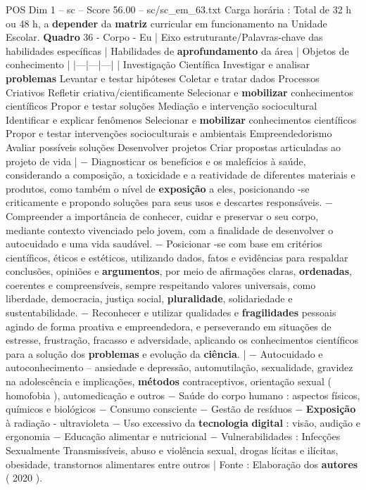 \begin{textsample}{POS Dim 1 – sc – Score 56.00 – sc/sc\_em\_63.txt}
Carga horária : Total de 32 h ou 48 h, a \textbf{depender} da \textbf{matriz} curricular em funcionamento na Unidade Escolar. \textbf{Quadro} 36 - Corpo - Eu | Eixo estruturante/Palavras-chave das habilidades específicas | Habilidades de \textbf{aprofundamento} da área | Objetos de conhecimento | |---|---|---| | Investigação Científica Investigar e analisar \textbf{problemas} Levantar e testar hipóteses Coletar e tratar dados Processos Criativos Refletir criativa/cientificamente Selecionar e \textbf{mobilizar} conhecimentos científicos Propor e testar soluções Mediação e intervenção sociocultural Identificar e explicar fenômenos Selecionar e \textbf{mobilizar} conhecimentos científicos Propor e testar intervenções socioculturais e ambientais Empreendedorismo Avaliar possíveis soluções Desenvolver projetos Criar propostas articuladas ao projeto de vida | − Diagnosticar os benefícios e os malefícios à saúde, considerando a composição, a toxicidade e a reatividade de diferentes materiais e produtos, como também o nível de \textbf{exposição} a eles, posicionando -se criticamente e propondo soluções para seus usos e descartes responsáveis. − Compreender a importância de conhecer, cuidar e preservar o seu corpo, mediante contexto vivenciado pelo jovem, com a finalidade de desenvolver o autocuidado e uma vida saudável. − Posicionar -se com base em critérios científicos, éticos e estéticos, utilizando dados, fatos e evidências para respaldar conclusões, opiniões e \textbf{argumentos}, por meio de afirmações claras, \textbf{ordenadas}, coerentes e compreensíveis, sempre respeitando valores universais, como liberdade, democracia, justiça social, \textbf{pluralidade}, solidariedade e sustentabilidade. − Reconhecer e utilizar qualidades e \textbf{fragilidades} pessoais agindo de forma proativa e empreendedora, e perseverando em situações de estresse, frustração, fracasso e adversidade, aplicando os conhecimentos científicos para a solução dos \textbf{problemas} e evolução da \textbf{ciência}. | − Autocuidado e autoconhecimento – ansiedade e depressão, automutilação, sexualidade, gravidez na adolescência e implicações, \textbf{métodos} contraceptivos, orientação sexual ( homofobia ), automedicação e outros − Saúde do corpo humano : aspectos físicos, químicos e biológicos − Consumo consciente − Gestão de resíduos − \textbf{Exposição} à radiação - ultravioleta − Uso excessivo da \textbf{tecnologia} \textbf{digital} : visão, audição e ergonomia − Educação alimentar e nutricional − Vulnerabilidades : Infecções Sexualmente Transmissíveis, abuso e violência sexual, drogas lícitas e ilícitas, obesidade, transtornos alimentares entre outros | Fonte : Elaboração dos \textbf{autores} ( 2020 ).

\end{textsample}
